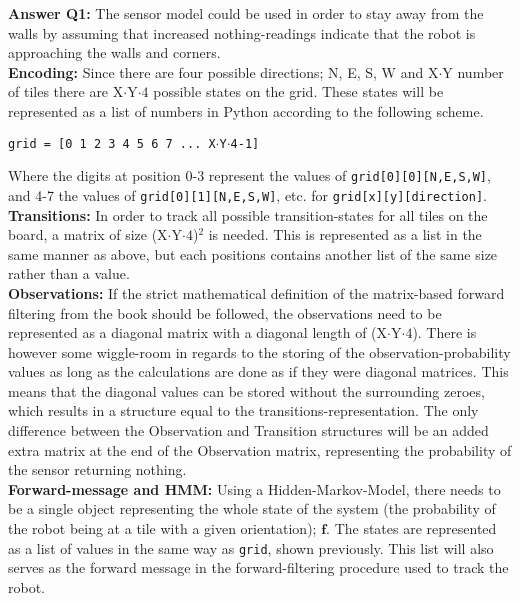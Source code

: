 \documentclass{article}
\renewcommand{\vec}[1]{$\textbf{#1}$}
\begin{document}
    \textbf{Answer Q1:} The sensor model could be used in order to stay away
    from the walls by assuming that increased nothing-readings indicate that
    the robot is approaching the walls and corners. \\

    \textbf{Encoding:} Since there are four possible directions; N, E, S, W
    and X$\cdot$Y number of tiles there are X${\cdot}$Y${\cdot}4$ possible
    states on the grid. These states will be represented as a list of numbers
    in Python according to the following scheme.

    \begin{center}
      \texttt{grid = [0 1 2 3 4 5 6 7 ...\ X$\cdot$Y$\cdot$4-1] }
    \end{center}

    Where the digits at position 0-3 represent the values of
    \texttt{grid[0][0][N,E,S,W]}, and 4-7 the values of
    \texttt{grid[0][1][N,E,S,W]}, etc. for \texttt{grid[x][y][direction]}. \\

    \textbf{Transitions:} In order to track all possible transition-states for
    all tiles on the board, a matrix of size (X${\cdot}$Y${\cdot}4$)$^2$ is
    needed. This is represented as a list in the same manner as above, but each
    positions contains another list of the same size rather than a value. \\

    \textbf{Observations:} If the strict mathematical definition of the
    matrix-based forward filtering from the book should be followed, the
    observations need to be represented as a diagonal matrix with a diagonal
    length of (X${\cdot}$Y${\cdot}4$). There is however some wiggle-room in
    regards to the storing of the observation-probability values as long as the
    calculations are done as if they were diagonal matrices. This means that the
    diagonal values can be stored without the surrounding zeroes, which results
    in a structure equal to the transitions-representation.
    The only difference between the Observation and Transition structures will
    be an added extra matrix at the end of the Observation matrix, representing
    the probability of the sensor returning nothing. \\

    \textbf{Forward-message and HMM:} Using a Hidden-Markov-Model, there
    needs to be a single object representing the whole state of the system (the
    probability of the robot being at a tile with a given orientation);
    \vec{f}. The states are represented as a list of values in the same way as
    \texttt{grid}, shown previously. This list will also serves as the forward
    message in the forward-filtering procedure used to track the robot.
\end{document}
